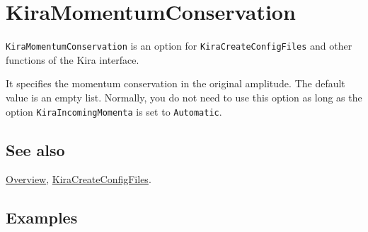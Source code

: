 \documentclass[../FeynHelpersManual.tex]{subfiles}
\begin{document}
\hypertarget{kiramomentumconservation}{
\section{KiraMomentumConservation}\label{kiramomentumconservation}}

\texttt{KiraMomentumConservation} is an option for
\texttt{KiraCreateConfigFiles} and other functions of the Kira
interface.

It specifies the momentum conservation in the original amplitude. The
default value is an empty list. Normally, you do not need to use this
option as long as the option \texttt{KiraIncomingMomenta} is set to
\texttt{Automatic}.

\subsection{See also}

\hyperlink{toc}{Overview},
\hyperlink{kiracreateconfigfiles}{KiraCreateConfigFiles}.

\subsection{Examples}
\end{document}
